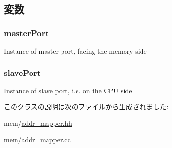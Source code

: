 \subsection{変数}
\hypertarget{classAddrMapper_a36c3558566dd375b12f573c2ea62992d}{
\subsubsection[{masterPort}]{ {\bf masterPort}}}
\label{classAddrMapper_a36c3558566dd375b12f573c2ea62992d}
Instance of master port, facing the memory side \hypertarget{classAddrMapper_a2a442ca0515b14d53305139d239ce090}{
\subsubsection[{slavePort}]{ {\bf slavePort}}}
\label{classAddrMapper_a2a442ca0515b14d53305139d239ce090}
Instance of slave port, i.e. on the CPU side 

このクラスの説明は次のファイルから生成されました:\begin{DoxyCompactItemize}
\item 
mem/\hyperlink{addr__mapper_8hh}{addr\_\-mapper.hh}\item 
mem/\hyperlink{addr__mapper_8cc}{addr\_\-mapper.cc}\end{DoxyCompactItemize}
